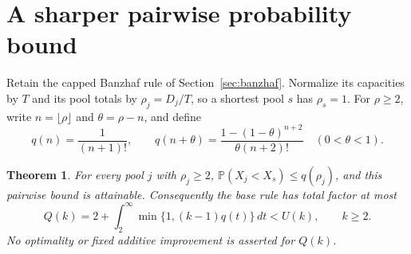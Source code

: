 \documentclass[11pt]{article}
\newtheorem{theorem}{Theorem}[section]
\theoremstyle{definition}\newtheorem{definition}[theorem]{Definition}
\theoremstyle{remark}\newtheorem{remark}[theorem]{Remark}
\newcommand{\Prob}{\mathbb P}
\begin{document}
\section{A sharper pairwise probability bound}\label{app:smallball}
Retain the capped Banzhaf rule of Section~\ref{sec:banzhaf}. Normalize its
capacities by $T$ and its pool totals by $\rho_j=D_j/T$, so a shortest pool
$s$ has $\rho_s=1$. For $\rho\ge2$, write $n=\lfloor\rho\rfloor$ and
$\theta=\rho-n$, and define
\[
 q(n)=\frac1{(n+1)!},\qquad
 q(n+\theta)=\frac{1-(1-\theta)^{n+2}}{\theta(n+2)!}
 \quad(0<\theta<1).
\]
\begin{theorem}\label{thm:smallball}
For every pool $j$ with $\rho_j\ge2$,
$\Prob(X_j<X_s)\le q(\rho_j)$, and this pairwise bound is attainable.
Consequently the base rule has total factor at most
\[
 Q(k)=2+\int_2^\infty\min\{1,(k-1)q(t)\}\,dt<U(k),\qquad k\ge2.
\]
No optimality or fixed additive improvement is asserted for $Q(k)$.
\end{theorem}
\end{document}
